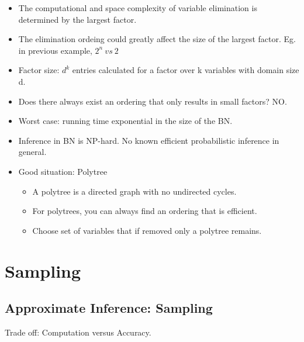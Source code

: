 \documentclass[11pt,a4paper]{report}
\begin{document}
\begin{itemize}
    \item The computational and space complexity of variable elimination is determined by the largest factor.
    \item The elimination ordeing could greatly affect the size of the largest factor. Eg. in previous example, $2^{n}\ vs\ 2$
    \item Factor size: $d^{k}$ entries calculated for a factor over k variables with domain size d.
    \item Does there always exist an ordering that only results in small factors? NO. 
    \item Worst case: running time exponential in the size of the BN.
    \item Inference in BN is NP-hard. No known efficient probabilistic inference in general.
    \item Good situation: Polytree
        \begin{itemize}
            \item A polytree is a directed graph with no undirected cycles.
            \item For polytrees, you can always find an ordering that is efficient.
            \item Choose set of variables that if removed only a polytree remains.
        \end{itemize}
    
\end{itemize}


\chapter{Sampling}

\section{Approximate Inference: Sampling}

Trade off: Computation versus Accuracy.
\end{document}
